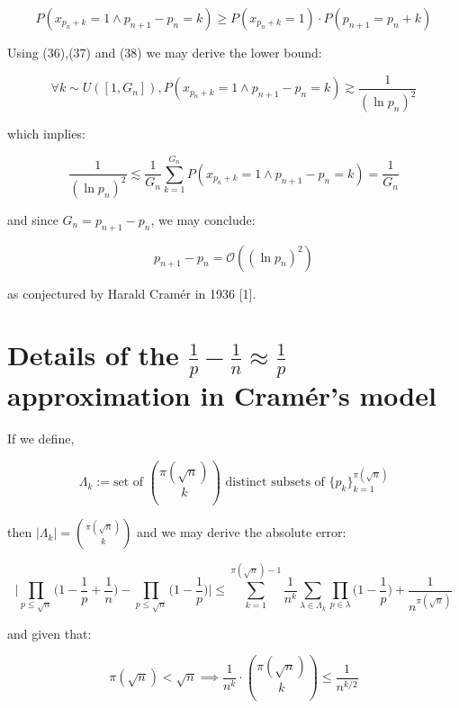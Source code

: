 \documentclass{article}
\newcommand{\gsim}{\gtrsim}
\newcommand{\lsim}{\lesssim}
\begin{document}
\begin{equation}
P(x_{p_n + k} = 1 \land p_{n+1}-p_n = k) \geq P(x_{p_n + k} = 1) \cdot P(p_{n+1} = p_n + k)
\end{equation}

Using (36),(37) and (38) we may derive the lower bound:

\begin{equation}
\forall k \sim U([1,G_n]),P(x_{p_n + k} = 1 \land p_{n+1}-p_n = k) \gsim \frac{1}{(\ln p_n)^2}
\end{equation}

which implies:

\begin{equation}
\frac{1}{(\ln p_n)^2} \lsim \frac{1}{G_n} \sum_{k=1}^{G_n} P(x_{p_n + k} = 1 \land p_{n+1}-p_n = k) = \frac{1}{G_n}
\end{equation}

and since $G_n = p_{n+1}-p_n$, we may conclude:

\begin{equation}
p_{n+1}-p_n = \mathcal{O}((\ln p_n)^2)
\end{equation}

as conjectured by Harald Cramér in 1936 [1].

\newpage

\section{Details of the $\frac{1}{p} - \frac{1}{n} \approx \frac{1}{p}$ approximation in Cramér's model}

If we define,

\begin{equation}
\Lambda_k := \text{set of } {\pi(\sqrt{n}) \choose k} \text{ distinct subsets of } \{p_k\}_{k=1}^{\pi(\sqrt{n})}
\end{equation}

then $\lvert \Lambda_k \rvert = {\pi(\sqrt{n}) \choose k}$ and we may derive the absolute error:

\begin{equation}
\Big\lvert \prod_{p \leq \sqrt{n}} \big(1-\frac{1}{p} + \frac{1}{n}) - \prod_{p \leq \sqrt{n}} \big(1-\frac{1}{p}\big) \Big\rvert \leq \sum_{k=1}^{\pi(\sqrt{n})-1} \frac{1}{n^k} \sum_{\lambda \in \Lambda_k} \prod_{p \in \lambda} \big(1-\frac{1}{p}\big) + \frac{1}{n^{\pi(\sqrt{n})}}
\end{equation}

and given that:

\begin{equation}
\pi(\sqrt{n}) < \sqrt{n} \implies \frac{1}{n^k} \cdot {\pi(\sqrt{n}) \choose k} \leq \frac{1}{n^{k/2}}
\end{equation}
\end{document}
